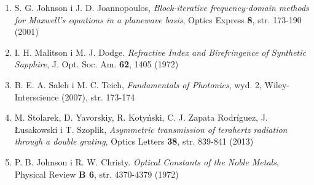 \documentclass[12pt,a4paper]{article}
\begin{document}
\begin{enumerate}
\item S. G. Johnson i J. D. Joannopoulos, \textit{Block-iterative frequency-domain methods for Maxwell's equations in a planewave basis}, Optics Express \textbf{8}, str. 173-190 (2001)
\item I. H. Malitson i M. J. Dodge. \textit{Refractive Index and Birefringence of Synthetic Sapphire}, J. Opt. Soc. Am. \textbf{62}, 1405 (1972)
\item B. E. A. Saleh i M. C. Teich, \textit{Fundamentals of Photonics}, wyd. 2, Wiley-Interscience (2007), str. 173-174
\item M. Stolarek, D. Yavorskiy, R. Kotyński, C. J. Zapata Rodríguez, J. Łusakowski i T. Szoplik, \textit{Asymmetric transmission of terahertz radiation through a double grating}, Optics Letters \textbf{38}, str. 839-841 (2013)
\item P. B. Johnson i R. W. Christy. \textit{Optical Constants of the Noble Metals}, Physical Review \textbf{B 6}, str. 4370-4379 (1972)
\end{enumerate}
\end{document}
